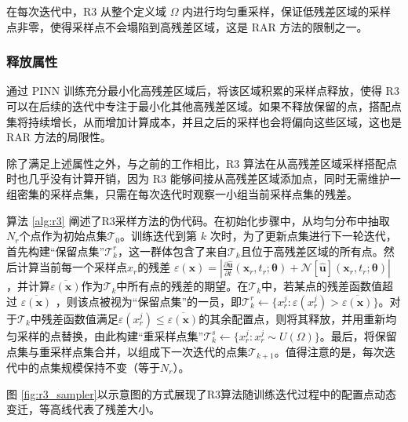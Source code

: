 在每次迭代中，R3 从整个定义域 $\varOmega $ 内进行均匀重采样，保证低残差区域的采样点非零，使得采样点不会塌陷到高残差区域，这是 RAR 方法的限制之一。

\subsubsection{释放属性}

通过 PINN 训练充分最小化高残差区域后，将该区域积累的采样点释放，使得 R3 可以在后续的迭代中专注于最小化其他高残差区域。如果不释放保留的点，搭配点集将持续增长，从而增加计算成本，并且之后的采样也会将偏向这些区域，这也是 RAR 方法的局限性。

除了满足上述属性之外，与之前的工作相比，R3 算法在从高残差区域采样搭配点时也几乎没有计算开销，因为 R3 能够间接从高残差区域添加点，同时无需维护一组密集的采样点集，只需在每次迭代时观察一小组当前采样点集的残差。

算法 \ref{alg:r3} 阐述了R3采样方法的伪代码。在初始化步骤中，从均匀分布中抽取$N_r$个点作为初始点集$\mathcal{T}_0$。训练迭代到第 $k$ 次时，为了更新点集进行下一轮迭代，首先构建“保留点集”$\mathcal{T}^r_k$，这一群体包含了来自$\mathcal{T}_k$且位于高残差区域的所有点。然后计算当前每一个采样点$x_r$的残差 $\varepsilon(\mathbf{x})=|\frac{\partial \boldsymbol{\hat{u}}}{\partial t}(\boldsymbol{x}_r,t_r;\boldsymbol{\theta})+\mathcal{N}[\boldsymbol{\hat{u}}](\boldsymbol{x}_r,t_r;\boldsymbol{\theta})|$ ，并计算$\overline{\varepsilon(\mathbf{x})}$作为$\mathcal{T}_k$中所有点的残差的期望。在$\mathcal{T}_k$中，若某点的残差函数值超过 $\overline{\varepsilon(\mathbf{x})}$ ，则该点被视为“保留点集”的一员，即$\mathcal{T}^r_k\leftarrow\{x^j_r:\varepsilon(x^j_r)>\overline{\varepsilon(\mathbf{x})}\}$。对于$\mathcal{T}_k$中残差函数值满足$\varepsilon(x^j_r)\leq\overline{\varepsilon(\mathbf{x})}$的其余配置点，则将其释放，并用重新均匀采样的点替换，由此构建“重采样点集”$\mathcal{T}^s_k\leftarrow\{x^j_r:x^j_r\sim U(\Omega)\}$。最后，将保留点集与重采样点集合并，以组成下一次迭代的点集$\mathcal{T}_{k+1}$。值得注意的是，每次迭代中的点集规模保持不变（等于$N_r$）。

图 \ref{fig:r3_sampler}以示意图的方式展现了R3算法随训练迭代过程中的配置点动态变迁，等高线代表了残差大小。

